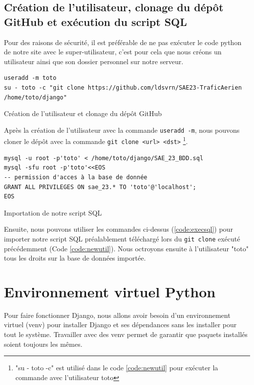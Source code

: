 \documentclass{article}
\begin{document}
        \subsection{Création de l'utilisateur, clonage du dépôt GitHub et exécution du script SQL}
        Pour des raisons de sécurité, il est préférable de ne pas exécuter le code python de notre site avec le super-utilisateur, c'est pour cela que nous créons un utilisateur ainsi que son dossier personnel sur notre serveur. 
        \begin{listing}[H]
            \begin{verbatim}
useradd -m toto
su - toto -c "git clone https://github.com/ldsvrn/SAE23-TraficAerien /home/toto/django"
            \end{verbatim}
            \caption{Création de l'utilisateur et clonage du dépôt GitHub}
            \label{code:newutil}
        \end{listing}
        Après la création de l'utilisateur avec la commande \verb|useradd -m|, nous pouvons cloner le dépôt avec la commande \verb|git clone <url> <dst>|
        \footnote{\label{note1}"su - toto -c" est utilisé dans le code \ref{code:newutil} pour exécuter la commande avec l'utilisateur toto}.

        \begin{listing}[H]
            \begin{verbatim}
mysql -u root -p'toto' < /home/toto/django/SAE_23_BDD.sql
mysql -sfu root -p'toto'<<EOS
-- permission d'acces à la base de donnée
GRANT ALL PRIVILEGES ON sae_23.* TO 'toto'@'localhost';
EOS
            \end{verbatim}
            \caption{Importation de notre script SQL}
            \label{code:execsql}
        \end{listing}
        Ensuite, nous pouvons utiliser les commandes ci-dessus (\ref{code:execsql}) pour importer notre script SQL préalablement téléchargé lors du \verb|git clone| exécuté précédemment (Code \ref{code:newutil}). Nous octroyons ensuite à l'utilisateur "toto" tous les droits sur la base de données importée.

\section{Environnement virtuel Python}
    Pour faire fonctionner Django, nous allons avoir besoin d'un environnement virtuel (venv) pour installer Django et ses dépendances sans les installer pour tout le système. Travailler avec des venv permet de garantir que paquets installés soient toujours les mêmes. 
\end{document}
